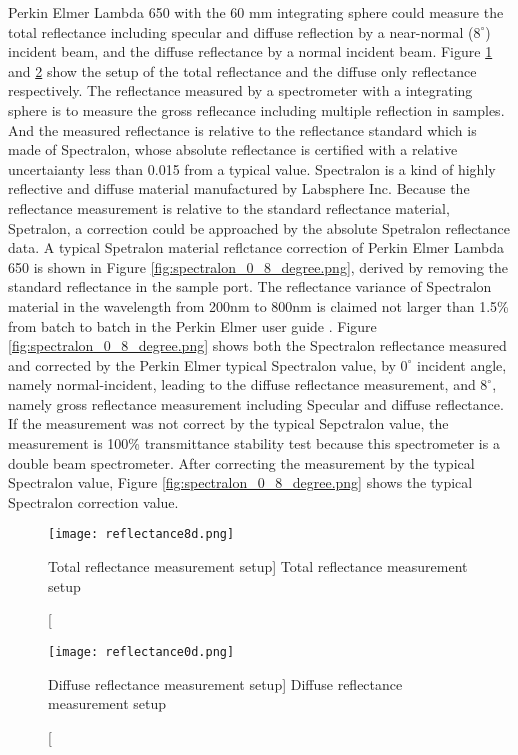 Perkin Elmer Lambda 650 with the 60 mm integrating sphere could measure
the total reflectance including specular and diffuse reflection by a near-normal ($8^\circ$) incident beam, and
the diffuse reflectance by a normal incident beam.
Figure \ref{fig:reflectance8d.png} and \ref{fig:reflectance0d.png} show the setup of the total reflectance and the diffuse only
reflectance respectively.
The reflectance measured by a spectrometer with a integrating sphere is to measure the gross reflecance including multiple reflection in samples.
And the measured reflectance is relative to the reflectance standard which is made of Spectralon, whose absolute reflectance is certified with
a relative uncertaianty less than 0.015 from a typical value. Spectralon is a kind of highly reflective and diffuse material manufactured by Labsphere Inc.
\cite{Labsphere}
Because the reflectance measurement is relative to the standard reflectance material, Spetralon,
a correction could be approached by the absolute Spetralon reflectance data.
A typical Spetralon material reflctance correction of Perkin Elmer Lambda 650 is
shown in Figure \ref{fig:spectralon_0_8_degree.png}, derived by removing the standard
reflectance in the sample port. The reflectance variance of Spectralon material in the wavelength from 200nm to 800nm
is claimed not larger than 1.5\% from batch to batch
in the Perkin Elmer user guide \cite{SphereAccessories}.
Figure \ref{fig:spectralon_0_8_degree.png} shows both the Spectralon reflectance measured and corrected by the Perkin Elmer typical Spectralon value,
by $0^\circ$ incident angle, namely normal-incident, leading to the diffuse reflectance measurement,
and $8^\circ$, namely gross reflectance measurement including Specular and diffuse reflectance.
If the measurement was not correct by the typical Sepctralon value, the measurement is 100\% transmittance stability test
because this spectrometer is a double beam spectrometer.
After correcting the measurement by the typical Spectralon value, Figure \ref{fig:spectralon_0_8_degree.png} shows the typical Spectralon correction value.


\begin{figure}
    \centering
    \texttt{[image: reflectance8d.png]}
    \caption
    [Total reflectance measurement setup]
    {Total reflectance measurement setup}
    \label{fig:reflectance8d.png}
    \end{figure}


\begin{figure}
    \centering
    \texttt{[image: reflectance0d.png]}
    \caption
    [Diffuse reflectance measurement setup]
    {Diffuse reflectance measurement setup}
    \label{fig:reflectance0d.png}
    \end{figure}


